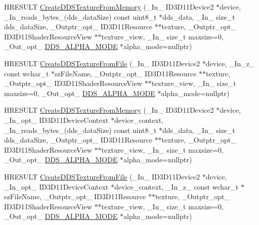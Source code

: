\begin{DoxyCompactItemize}
H\+R\+E\+S\+U\+LT \hyperlink{namespacemage_ae694dfc6b3a2c61338a346041f223306}{Create\+D\+D\+S\+Texture\+From\+Memory} (\+\_\+\+In\+\_\+ I\+D3\+D11\+Device2 $\ast$device, \+\_\+\+In\+\_\+reads\+\_\+bytes\+\_\+(dds\+\_\+data\+Size) const uint8\+\_\+t $\ast$dds\+\_\+data, \+\_\+\+In\+\_\+ size\+\_\+t dds\+\_\+data\+Size, \+\_\+\+Outptr\+\_\+opt\+\_\+ I\+D3\+D11\+Resource $\ast$$\ast$texture, \+\_\+\+Outptr\+\_\+opt\+\_\+ I\+D3\+D11\+Shader\+Resource\+View $\ast$$\ast$texture\+\_\+view, \+\_\+\+In\+\_\+ size\+\_\+t maxsize=0, \+\_\+\+Out\+\_\+opt\+\_\+ \hyperlink{namespacemage_a0c586a2bad862f4858900ca121ca80c2}{D\+D\+S\+\_\+\+A\+L\+P\+H\+A\+\_\+\+M\+O\+DE} $\ast$alpha\+\_\+mode=nullptr)
\item 
H\+R\+E\+S\+U\+LT \hyperlink{namespacemage_a9ebb3d4391bb4b5b1393fc1efce57d8e}{Create\+D\+D\+S\+Texture\+From\+File} (\+\_\+\+In\+\_\+ I\+D3\+D11\+Device2 $\ast$device, \+\_\+\+In\+\_\+z\+\_\+ const wchar\+\_\+t $\ast$sz\+File\+Name, \+\_\+\+Outptr\+\_\+opt\+\_\+ I\+D3\+D11\+Resource $\ast$$\ast$texture, \+\_\+\+Outptr\+\_\+opt\+\_\+ I\+D3\+D11\+Shader\+Resource\+View $\ast$$\ast$texture\+\_\+view, \+\_\+\+In\+\_\+ size\+\_\+t maxsize=0, \+\_\+\+Out\+\_\+opt\+\_\+ \hyperlink{namespacemage_a0c586a2bad862f4858900ca121ca80c2}{D\+D\+S\+\_\+\+A\+L\+P\+H\+A\+\_\+\+M\+O\+DE} $\ast$alpha\+\_\+mode=nullptr)
\item 
H\+R\+E\+S\+U\+LT \hyperlink{namespacemage_a0f7b5b2cc18c9d007e91397ac7916aad}{Create\+D\+D\+S\+Texture\+From\+Memory} (\+\_\+\+In\+\_\+ I\+D3\+D11\+Device2 $\ast$device, \+\_\+\+In\+\_\+opt\+\_\+ I\+D3\+D11\+Device\+Context $\ast$device\+\_\+context, \+\_\+\+In\+\_\+reads\+\_\+bytes\+\_\+(dds\+\_\+data\+Size) const uint8\+\_\+t $\ast$dds\+\_\+data, \+\_\+\+In\+\_\+ size\+\_\+t dds\+\_\+data\+Size, \+\_\+\+Outptr\+\_\+opt\+\_\+ I\+D3\+D11\+Resource $\ast$$\ast$texture, \+\_\+\+Outptr\+\_\+opt\+\_\+ I\+D3\+D11\+Shader\+Resource\+View $\ast$$\ast$texture\+\_\+view, \+\_\+\+In\+\_\+ size\+\_\+t maxsize=0, \+\_\+\+Out\+\_\+opt\+\_\+ \hyperlink{namespacemage_a0c586a2bad862f4858900ca121ca80c2}{D\+D\+S\+\_\+\+A\+L\+P\+H\+A\+\_\+\+M\+O\+DE} $\ast$alpha\+\_\+mode=nullptr)
\item 
H\+R\+E\+S\+U\+LT \hyperlink{namespacemage_abec1d90d8e2d6c8ce1bfa74c2854bdfe}{Create\+D\+D\+S\+Texture\+From\+File} (\+\_\+\+In\+\_\+ I\+D3\+D11\+Device2 $\ast$device, \+\_\+\+In\+\_\+opt\+\_\+ I\+D3\+D11\+Device\+Context $\ast$device\+\_\+context, \+\_\+\+In\+\_\+z\+\_\+ const wchar\+\_\+t $\ast$sz\+File\+Name, \+\_\+\+Outptr\+\_\+opt\+\_\+ I\+D3\+D11\+Resource $\ast$$\ast$texture, \+\_\+\+Outptr\+\_\+opt\+\_\+ I\+D3\+D11\+Shader\+Resource\+View $\ast$$\ast$texture\+\_\+view, \+\_\+\+In\+\_\+ size\+\_\+t maxsize=0, \+\_\+\+Out\+\_\+opt\+\_\+ \hyperlink{namespacemage_a0c586a2bad862f4858900ca121ca80c2}{D\+D\+S\+\_\+\+A\+L\+P\+H\+A\+\_\+\+M\+O\+DE} $\ast$alpha\+\_\+mode=nullptr)

\end{DoxyCompactItemize}
